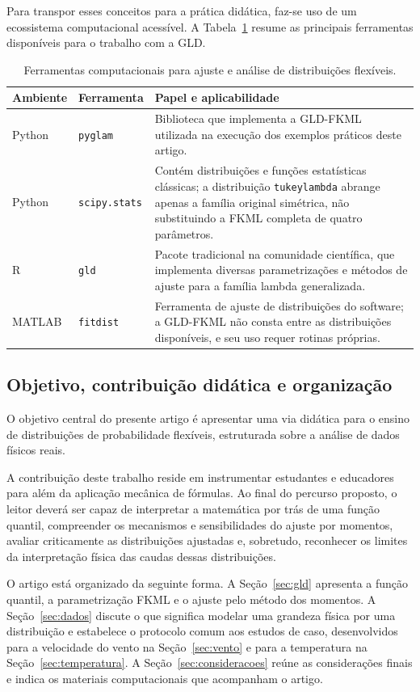 Para transpor esses conceitos para a prática didática, faz-se uso de um ecossistema computacional acessível. A Tabela~\ref{tab:ferramentas} resume as principais ferramentas disponíveis para o trabalho com a GLD.

\begin{table}[htbp]
\centering
\caption{Ferramentas computacionais para ajuste e análise de distribuições flexíveis.}
\label{tab:ferramentas}
\small
\begin{tabular}{p{1.8cm} p{2.6cm} p{9.6cm}}
\toprule
\textbf{Ambiente} & \textbf{Ferramenta} & \textbf{Papel e aplicabilidade} \\
\midrule
Python & \texttt{pyglam} \parencite{pyglam} & Biblioteca que implementa a GLD-FKML utilizada na execução dos exemplos práticos deste artigo. \\
Python & \texttt{scipy.stats} \parencite{scipy2020} & Contém distribuições e funções estatísticas clássicas; a distribuição \texttt{tukeylambda} abrange apenas a família original simétrica, não substituindo a FKML completa de quatro parâmetros. \\
R & \texttt{gld} \parencite{KingGld} & Pacote tradicional na comunidade científica, que implementa diversas parametrizações e métodos de ajuste para a família lambda generalizada. \\
MATLAB & \texttt{fitdist} & Ferramenta de ajuste de distribuições do software; a GLD-FKML não consta entre as distribuições disponíveis, e seu uso requer rotinas próprias. \\
\bottomrule
\end{tabular}
\end{table}

\subsection{Objetivo, contribuição didática e organização}

O objetivo central do presente artigo é apresentar uma via didática para o ensino de distribuições de probabilidade flexíveis, estruturada sobre a análise de dados físicos reais.

A contribuição deste trabalho reside em instrumentar estudantes e educadores para além da aplicação mecânica de fórmulas. Ao final do percurso proposto, o leitor deverá ser capaz de interpretar a matemática por trás de uma função quantil, compreender os mecanismos e sensibilidades do ajuste por momentos, avaliar criticamente as distribuições ajustadas e, sobretudo, reconhecer os limites da interpretação física das caudas dessas distribuições.

O artigo está organizado da seguinte forma. A Seção~\ref{sec:gld} apresenta a função quantil, a parametrização FKML e o ajuste pelo método dos momentos. A Seção~\ref{sec:dados} discute o que significa modelar uma grandeza física por uma distribuição e estabelece o protocolo comum aos estudos de caso, desenvolvidos para a velocidade do vento na Seção~\ref{sec:vento} e para a temperatura na Seção~\ref{sec:temperatura}. A Seção~\ref{sec:consideracoes} reúne as considerações finais e indica os materiais computacionais que acompanham o artigo.

